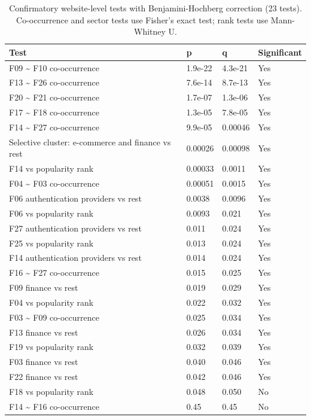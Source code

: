 \documentclass[letterpaper,twocolumn,10pt]{article}
\begin{document}
\begin{table}[t]\centering\footnotesize\setlength{\tabcolsep}{3pt}\caption{Confirmatory website-level tests with Benjamini-Hochberg correction (23 tests). Co-occurrence and sector tests use Fisher's exact test; rank tests use Mann-Whitney U.}\label{tab:11}
\begin{tabularx}{\columnwidth}{>{\raggedright\arraybackslash}Xlll}\toprule
\textbf{Test} & \textbf{p} & \textbf{q} & \textbf{Significant} \\ \midrule
F09 \textasciitilde{} F10 co-occurrence & 1.9e-22 & 4.3e-21 & Yes \\
F13 \textasciitilde{} F26 co-occurrence & 7.6e-14 & 8.7e-13 & Yes \\
F20 \textasciitilde{} F21 co-occurrence & 1.7e-07 & 1.3e-06 & Yes \\
F17 \textasciitilde{} F18 co-occurrence & 1.3e-05 & 7.8e-05 & Yes \\
F14 \textasciitilde{} F27 co-occurrence & 9.9e-05 & 0.00046 & Yes \\
Selective cluster: e-commerce and finance vs rest & 0.00026 & 0.00098 & Yes \\
F14 vs popularity rank & 0.00033 & 0.0011 & Yes \\
F04 \textasciitilde{} F03 co-occurrence & 0.00051 & 0.0015 & Yes \\
F06 authentication providers vs rest & 0.0038 & 0.0096 & Yes \\
F06 vs popularity rank & 0.0093 & 0.021 & Yes \\
F27 authentication providers vs rest & 0.011 & 0.024 & Yes \\
F25 vs popularity rank & 0.013 & 0.024 & Yes \\
F14 authentication providers vs rest & 0.014 & 0.024 & Yes \\
F16 \textasciitilde{} F27 co-occurrence & 0.015 & 0.025 & Yes \\
F09 finance vs rest & 0.019 & 0.029 & Yes \\
F04 vs popularity rank & 0.022 & 0.032 & Yes \\
F03 \textasciitilde{} F09 co-occurrence & 0.025 & 0.034 & Yes \\
F13 finance vs rest & 0.026 & 0.034 & Yes \\
F19 vs popularity rank & 0.032 & 0.039 & Yes \\
F03 finance vs rest & 0.040 & 0.046 & Yes \\
F22 finance vs rest & 0.042 & 0.046 & Yes \\
F18 vs popularity rank & 0.048 & 0.050 & No \\
F14 \textasciitilde{} F16 co-occurrence & 0.45 & 0.45 & No \\
\bottomrule\end{tabularx}\end{table}
\end{document}
